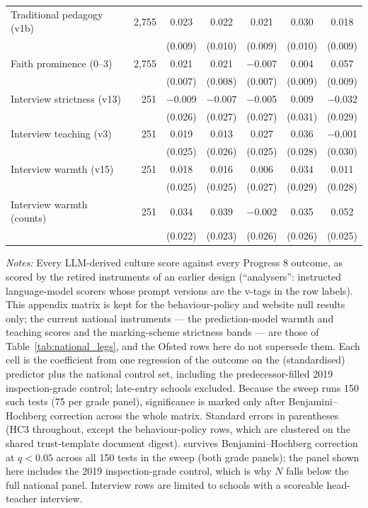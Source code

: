 \begin{table}[htbp]
\begin{tabular}{lrccccc}
Traditional pedagogy (v1b) & 2{,}755 & 0.023\sym{\dagger} & 0.022 & 0.021 & 0.030\sym{\dagger} & 0.018 \\
 & & (0.009) & (0.010) & (0.009) & (0.010) & (0.009) \\
Faith prominence (0--3) & 2{,}755 & 0.021\sym{\dagger} & 0.021\sym{\dagger} & $-$0.007 & 0.004 & 0.057\sym{\dagger} \\
 & & (0.007) & (0.008) & (0.007) & (0.009) & (0.009) \\
Interview strictness (v13) & 251 & $-$0.009 & $-$0.007 & $-$0.005 & 0.009 & $-$0.032 \\
 & & (0.026) & (0.027) & (0.027) & (0.031) & (0.029) \\
Interview teaching (v3) & 251 & 0.019 & 0.013 & 0.027 & 0.036 & $-$0.001 \\
 & & (0.025) & (0.026) & (0.025) & (0.028) & (0.030) \\
Interview warmth (v15) & 251 & 0.018 & 0.016 & 0.006 & 0.034 & 0.011 \\
 & & (0.025) & (0.025) & (0.027) & (0.029) & (0.028) \\
Interview warmth (counts) & 251 & 0.034 & 0.039 & $-$0.002 & 0.035 & 0.052 \\
 & & (0.022) & (0.023) & (0.026) & (0.026) & (0.025) \\
\bottomrule
\end{tabular}
\begin{minipage}{\linewidth}
\smallskip
\footnotesize\textit{Notes:} Every LLM-derived culture score against every Progress 8 outcome, as scored by the retired instruments of an earlier design (``analysers'': instructed language-model scorers whose prompt versions are the v-tags in the row labels). This appendix matrix is kept for the behaviour-policy and website null results only; the current national instruments --- the prediction-model warmth and teaching scores and the marking-scheme strictness bands --- are those of Table~\ref{tab:national_legs}, and the Ofsted rows here do not supersede them. Each cell is the coefficient from one regression of the outcome on the (standardised) predictor plus the national control set, including the predecessor-filled 2019 inspection-grade control; late-entry schools excluded. Because the sweep runs 150 such tests (75 per grade panel), significance is marked only after Benjamini--Hochberg correction across the whole matrix. Standard errors in parentheses (HC3 throughout, except the
behaviour-policy rows, which are clustered on the shared trust-template document
digest). \sym{\dagger} survives Benjamini--Hochberg correction at $q<0.05$ across all 150
tests in the sweep (both grade panels); the panel shown here includes the 2019
inspection-grade control, which is why $N$ falls below the full national panel. Interview rows are limited to schools with a scoreable
head-teacher interview.
\end{minipage}
\end{table}
